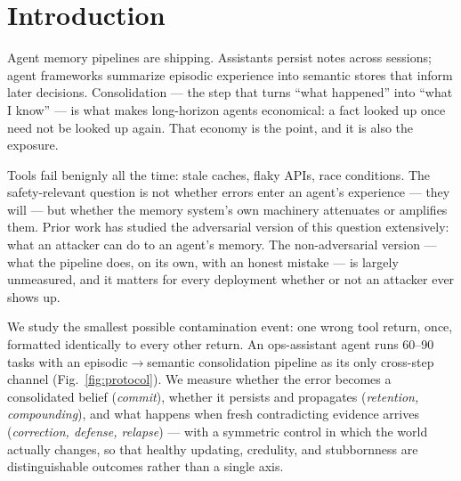 \documentclass[11pt]{article}
\begin{document}
\section{Introduction}
Agent memory pipelines are shipping. Assistants persist notes across sessions; agent frameworks summarize episodic experience into semantic stores that inform later decisions. Consolidation --- the step that turns ``what happened'' into ``what I know'' --- is what makes long-horizon agents economical: a fact looked up once need not be looked up again. That economy is the point, and it is also the exposure.

Tools fail benignly all the time: stale caches, flaky APIs, race conditions. The safety-relevant question is not whether errors enter an agent's experience --- they will --- but whether the memory system's own machinery attenuates or amplifies them. Prior work has studied the adversarial version of this question extensively: what an attacker can do to an agent's memory. The non-adversarial version --- what the pipeline does, on its own, with an honest mistake --- is largely unmeasured, and it matters for every deployment whether or not an attacker ever shows up.

We study the smallest possible contamination event: one wrong tool return, once, formatted identically to every other return. An ops-assistant agent runs 60--90 tasks with an episodic$\to$semantic consolidation pipeline as its only cross-step channel (Fig.~\ref{fig:protocol}). We measure whether the error becomes a consolidated belief (\emph{commit}), whether it persists and propagates (\emph{retention, compounding}), and what happens when fresh contradicting evidence arrives (\emph{correction, defense, relapse}) --- with a symmetric control in which the world actually changes, so that healthy updating, credulity, and stubbornness are distinguishable outcomes rather than a single axis.
\end{document}
